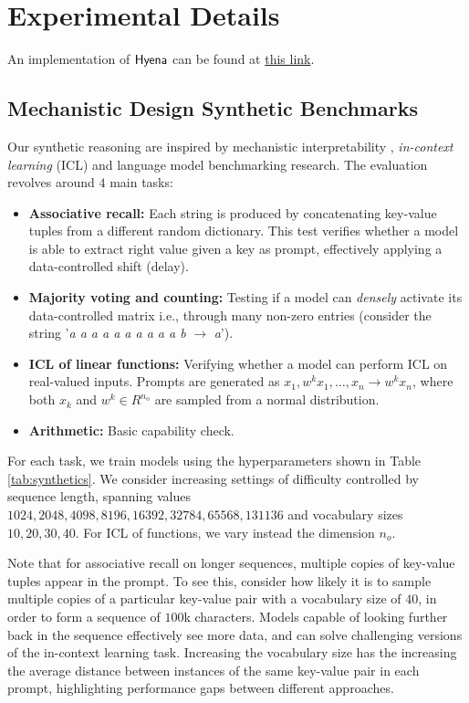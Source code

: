 \clearpage
\section{Experimental Details}
\label{appendix:experiment-details}
%
An implementation of ${\sf Hyena}$ can be found at \href{https://github.com/HazyResearch/safari}{this link}.
%

\subsection{Mechanistic Design Synthetic Benchmarks}\label{app:icl}
%
Our synthetic reasoning are inspired by mechanistic interpretability \citep{elhage2021mathematical}, \textit{in-context learning} (ICL) \citep{garg2022can} and language model benchmarking \citep{liang2022holistic} research. The evaluation revolves around $4$ main tasks:
\begin{itemize}[leftmargin=0.2in]
    \item \textbf{Associative recall:} Each string is produced by concatenating key-value tuples from a different random dictionary. This test verifies whether a model is able to extract right value given a key as prompt, effectively applying a data-controlled shift (delay).
    \item \textbf{Majority voting and counting:} Testing if a model can \textit{densely} activate its data-controlled matrix i.e., through many non-zero entries (consider the string '\textit{a a a a a a a a a a b} $\rightarrow$ \textit{a}').
    \item \textbf{ICL of linear functions:} Verifying whether a model can perform ICL on real-valued inputs. Prompts are generated as $x_1, w^k x_1, \dots, x_n \rightarrow w^k x_n$, where both $x_k$ and $w^k \in R^{n_o}$ are sampled from a normal distribution.  
    \item \textbf{Arithmetic:} Basic capability check. 
\end{itemize}

For each task, we train models using the hyperparameters shown in Table \ref{tab:synthetics}. We consider increasing settings of difficulty controlled by sequence length, spanning values $1024, 2048, 4098, 8196, 16392, 32784, 65568, 131136$ and vocabulary sizes $10, 20, 30, 40$. For ICL of functions, we vary instead the dimension $n_o$.

Note that for associative recall on longer sequences, multiple copies of key-value tuples appear in the prompt. To see this, consider how likely it is to sample multiple copies of a particular key-value pair with a vocabulary size of $40$, in order to form a sequence of $100$k characters. Models capable of looking further back in the sequence effectively see more data, and can solve challenging versions of the in-context learning task. Increasing the vocabulary size has the increasing the average distance between instances of the same key-value pair in each prompt, highlighting performance gaps between different approaches.


